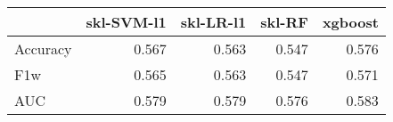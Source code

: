 \begin{tabular}{lrrrr}
\toprule
{} &  skl-SVM-l1 &  skl-LR-l1 &  skl-RF &  xgboost \\
\midrule
Accuracy &       0.567 &      0.563 &   0.547 &    0.576 \\
F1w      &       0.565 &      0.563 &   0.547 &    0.571 \\
AUC      &       0.579 &      0.579 &   0.576 &    0.583 \\
\bottomrule
\end{tabular}
